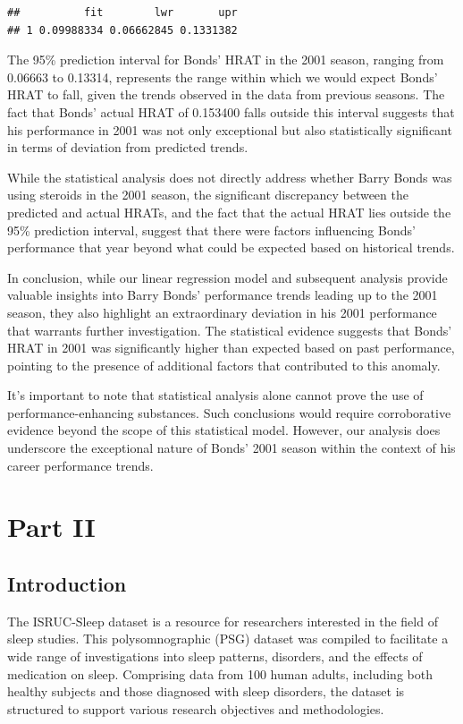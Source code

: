 \documentclass[
]{article}
\begin{document}
\begin{verbatim}
##          fit        lwr       upr
## 1 0.09988334 0.06662845 0.1331382
\end{verbatim}

The 95\% prediction interval for Bonds' HRAT in the 2001 season, ranging
from 0.06663 to 0.13314, represents the range within which we would
expect Bonds' HRAT to fall, given the trends observed in the data from
previous seasons. The fact that Bonds' actual HRAT of 0.153400 falls
outside this interval suggests that his performance in 2001 was not only
exceptional but also statistically significant in terms of deviation
from predicted trends.

While the statistical analysis does not directly address whether Barry
Bonds was using steroids in the 2001 season, the significant discrepancy
between the predicted and actual HRATs, and the fact that the actual
HRAT lies outside the 95\% prediction interval, suggest that there were
factors influencing Bonds' performance that year beyond what could be
expected based on historical trends.

In conclusion, while our linear regression model and subsequent analysis
provide valuable insights into Barry Bonds' performance trends leading
up to the 2001 season, they also highlight an extraordinary deviation in
his 2001 performance that warrants further investigation. The
statistical evidence suggests that Bonds' HRAT in 2001 was significantly
higher than expected based on past performance, pointing to the presence
of additional factors that contributed to this anomaly.

It's important to note that statistical analysis alone cannot prove the
use of performance-enhancing substances. Such conclusions would require
corroborative evidence beyond the scope of this statistical model.
However, our analysis does underscore the exceptional nature of Bonds'
2001 season within the context of his career performance trends.

\newpage

\section{Part II}\label{part-ii}

\subsection{Introduction}\label{introduction}

The ISRUC-Sleep dataset is a resource for researchers interested in the
field of sleep studies. This polysomnographic (PSG) dataset was compiled
to facilitate a wide range of investigations into sleep patterns,
disorders, and the effects of medication on sleep. Comprising data from
100 human adults, including both healthy subjects and those diagnosed
with sleep disorders, the dataset is structured to support various
research objectives and methodologies.
\end{document}

